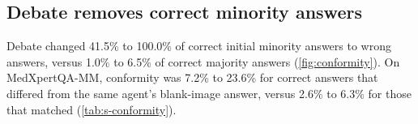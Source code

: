 \subsection{Debate removes correct minority answers}
Debate changed 41.5\% to 100.0\% of correct initial minority answers to wrong answers, versus 1.0\% to 6.5\% of correct majority answers (\cref{fig:conformity}).
On MedXpertQA-MM, conformity was 7.2\% to 23.6\% for correct answers that differed from the same agent's blank-image answer, versus 2.6\% to 6.3\% for those that matched (\cref{tab:s-conformity}).
